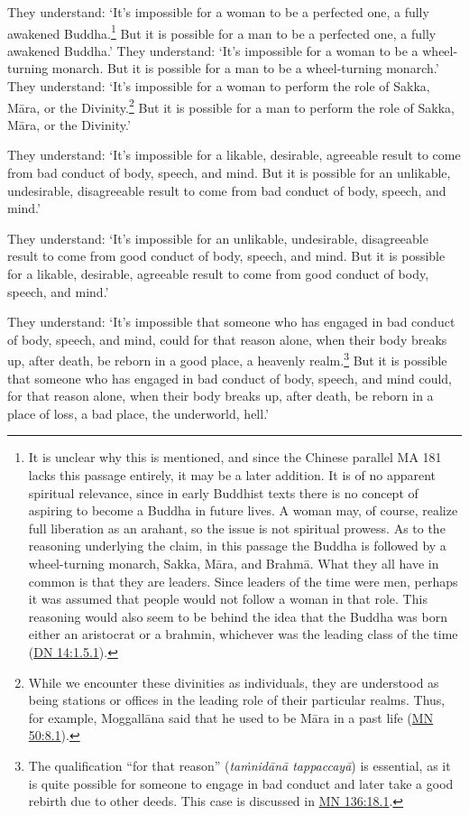 \documentclass[12pt,openany]{book}%
\begin{document}
They understand: ‘It’s impossible for a woman to be a perfected one, a fully awakened Buddha.\footnote{It is unclear why this is mentioned, and since the Chinese parallel MA 181 lacks this passage entirely, it may be a later addition. It is of no apparent spiritual relevance, since in early Buddhist texts there is no concept of aspiring to become a Buddha in future lives. A woman may, of course, realize full liberation as an arahant, so the issue is not spiritual prowess. As to the reasoning underlying the claim, in this passage the Buddha is followed by a wheel-turning monarch, Sakka, \textsanskrit{Māra}, and \textsanskrit{Brahmā}. What they all have in common is that they are leaders. Since leaders of the time were men, perhaps it was assumed that people would not follow a woman in that role. This reasoning would also seem to be behind the idea that the Buddha was born either an aristocrat or a brahmin, whichever was the leading class of the time (\href{https://suttacentral.net/dn14/en/sujato\#1.5.1}{DN 14:1.5.1}). } But it is possible for a man to be a perfected one, a fully awakened Buddha.’ They understand: ‘It’s impossible for a woman to be a wheel-turning monarch. But it is possible for a man to be a wheel-turning monarch.’ They understand: ‘It’s impossible for a woman to perform the role of Sakka, \textsanskrit{Māra}, or the Divinity.\footnote{While we encounter these divinities as individuals, they are understood as being stations or offices in the leading role of their particular realms. Thus, for example, \textsanskrit{Moggallāna} said that he used to be \textsanskrit{Māra} in a past life (\href{https://suttacentral.net/mn50/en/sujato\#8.1}{MN 50:8.1}). } But it is possible for a man to perform the role of Sakka, \textsanskrit{Māra}, or the Divinity.’ 

They understand: ‘It’s impossible for a likable, desirable, agreeable result to come from bad conduct of body, speech, and mind. But it is possible for an unlikable, undesirable, disagreeable result to come from bad conduct of body, speech, and mind.’ 

They understand: ‘It’s impossible for an unlikable, undesirable, disagreeable result to come from good conduct of body, speech, and mind. But it is possible for a likable, desirable, agreeable result to come from good conduct of body, speech, and mind.’ 

They understand: ‘It’s impossible that someone who has engaged in bad conduct of body, speech, and mind, could for that reason alone, when their body breaks up, after death, be reborn in a good place, a heavenly realm.\footnote{The qualification “for that reason” (\textit{\textsanskrit{taṁnidānā} \textsanskrit{tappaccayā}}) is essential, as it is quite possible for someone to engage in bad conduct and later take a good rebirth due to other deeds. This case is discussed in \href{https://suttacentral.net/mn136/en/sujato\#18.1}{MN 136:18.1}. } But it is possible that someone who has engaged in bad conduct of body, speech, and mind could, for that reason alone, when their body breaks up, after death, be reborn in a place of loss, a bad place, the underworld, hell.’ 
\end{document}
